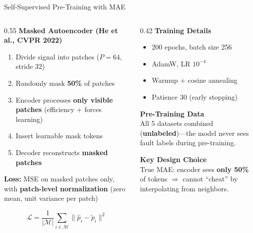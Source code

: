 \documentclass[aspectratio=169, 11pt]{beamer}
\begin{document}
\begin{frame}{Self-Supervised Pre-Training with MAE}
\begin{columns}[T]
\begin{column}{0.55\textwidth}
\textbf{Masked Autoencoder (He et al., CVPR 2022)}
\begin{enumerate}
    \item Divide signal into patches ($P{=}64$, stride $32$)
    \item Randomly mask \textbf{50\%} of patches
    \item Encoder processes \textbf{only visible patches} (efficiency + forces learning)
    \item Insert learnable mask tokens
    \item Decoder reconstructs \textbf{masked patches}
\end{enumerate}

\vspace{0.3cm}
\textbf{Loss:} MSE on masked patches only, with \textbf{patch-level normalization} (zero mean, unit variance per patch)

\[
\mathcal{L} = \frac{1}{|\mathcal{M}|}\sum_{i \in \mathcal{M}} \| \hat{p}_i - \tilde{p}_i \|^2
\]
\end{column}
\begin{column}{0.42\textwidth}
\textbf{Training Details}
\begin{itemize}
    \item 200 epochs, batch size 256
    \item AdamW, LR $10^{-4}$
    \item Warmup + cosine annealing
    \item Patience 30 (early stopping)
\end{itemize}

\vspace{0.3cm}
\textbf{Pre-Training Data}\\
All 5 datasets combined (\textbf{unlabeled})---the model never sees fault labels during pre-training.

\vspace{0.3cm}
\textbf{Key Design Choice}\\
True MAE: encoder sees \textbf{only 50\%} of tokens $\Rightarrow$ cannot ``cheat'' by interpolating from neighbors.
\end{column}
\end{columns}
\end{frame}

\end{document}
